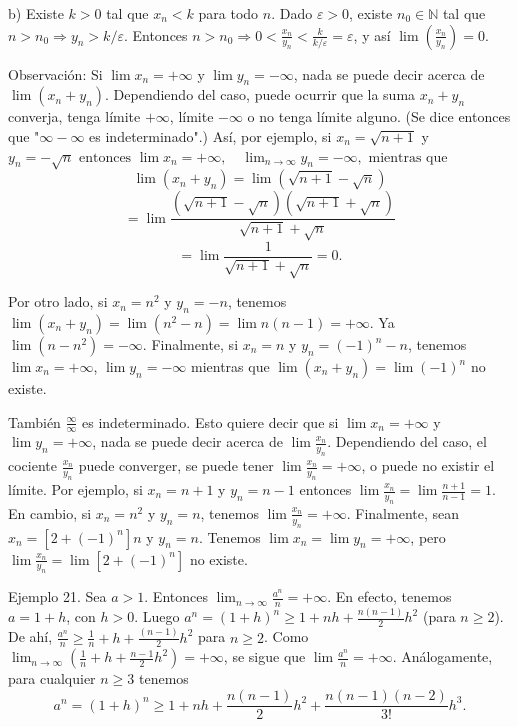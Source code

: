 \documentclass[12pt,oneside]{book}
\begin{document}
b) Existe \(k > 0\) tal que \(x_n < k\) para todo \(n\). Dado \(\varepsilon > 0\), existe \(n_0 \in \mathbb{N}\) tal que \(n > n_0 \Rightarrow y_n > k/\varepsilon\). Entonces \(n > n_0 \Rightarrow 0 < \frac{x_n}{y_n} < \frac{k}{k/\varepsilon} = \varepsilon\), y así \(\lim\left(\frac{x_n}{y_n}\right) = 0\).

Observación: Si \(\lim x_n = +\infty\) y \(\lim y_n = -\infty\), nada se puede decir acerca de \(\lim(x_n + y_n)\). Dependiendo del caso, puede ocurrir que la suma \(x_n + y_n\) converja, tenga límite \(+\infty\), límite \(-\infty\) o no tenga límite alguno. (Se dice entonces que "\(\infty - \infty\) es indeterminado".) Así, por ejemplo, si \(x_n = \sqrt{n+1}\) y \( y_n = -\sqrt{n} \text{ entonces } \lim x_n = +\infty, \quad \lim_{n \to \infty} y_n = -\infty, \text{ mientras que }\)
\[
\lim(x_n + y_n) = \lim(\sqrt{n+1} - \sqrt{n})
\]
\[
= \lim \frac{(\sqrt{n+1} - \sqrt{n})(\sqrt{n+1} + \sqrt{n})}{\sqrt{n+1} + \sqrt{n}}
\]
\[
= \lim \frac{1}{\sqrt{n+1} + \sqrt{n}} = 0.
\]

Por otro lado, si \(x_n = n^2\) y \(y_n = -n\), tenemos \(\lim(x_n + y_n) = \lim(n^2 - n) = \lim n(n-1) = +\infty\). Ya \(\lim(n - n^2) = -\infty\). Finalmente, si \(x_n = n\) y \(y_n = (-1)^n - n\), tenemos \(\lim x_n = +\infty\), \(\lim y_n = -\infty\) mientras que \(\lim(x_n + y_n) = \lim(-1)^n\) no existe.

También \(\frac{\infty}{\infty}\) es indeterminado. Esto quiere decir que si \(\lim x_n = +\infty\) y \(\lim y_n = +\infty\), nada se puede decir acerca de \(\lim \frac{x_n}{y_n}\). Dependiendo del caso, el cociente \(\frac{x_n}{y_n}\) puede converger, se puede tener \(\lim \frac{x_n}{y_n} = +\infty\), o puede no existir el límite. Por ejemplo, si \(x_n = n+1\) y \(y_n = n-1\) entonces \(\lim \frac{x_n}{y_n} = \lim \frac{n+1}{n-1} = 1\). En cambio, si \(x_n = n^2\) y \(y_n = n\), tenemos \(\lim \frac{x_n}{y_n} = +\infty\). Finalmente, sean \(x_n = [2 + (-1)^n]n\) y \(y_n = n\). Tenemos \(\lim x_n = \lim y_n = +\infty\), pero \(\lim \frac{x_n}{y_n} = \lim[2 + (-1)^n]\) no existe.

Ejemplo 21. Sea \(a > 1\). Entonces \(\lim_{n \to \infty} \frac{a^n}{n} = +\infty\). En efecto, tenemos \(a = 1 + h\), con \(h > 0\). Luego \(a^n = (1 + h)^n \geq 1 + nh + \frac{n(n-1)}{2}h^2\) (para \(n \geq 2\)). De ahí, \(\frac{a^n}{n} \geq \frac{1}{n} + h + \frac{(n-1)}{2}h^2\) para \(n \geq 2\). Como \(\lim_{n \to \infty} \left( \frac{1}{n} + h + \frac{n-1}{2}h^2 \right) = +\infty\), se sigue que \(\lim \frac{a^n}{n} = +\infty\). Análogamente, para cualquier \(n \geq 3\) tenemos
\[
a^n = (1 + h)^n \geq 1 + nh + \frac{n(n-1)}{2}h^2 + \frac{n(n-1)(n-2)}{3!}h^3.
\]
\end{document}
